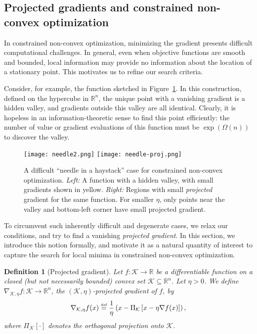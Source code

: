 \documentclass{article}
\newcommand{\equaldef}{\stackrel{\text{\tiny def}}{=}}
\newcommand{\K}{\ensuremath{\mathcal K}}
\newcommand{\pa}[1]{\left(#1\right)}
\newcommand{\bra}[1]{\left[#1\right]}
\newcommand{\R}{\mathbb{R}}
\newtheorem{definition}[theorem]{Definition}
\renewcommand{\K}{\mathcal{K}}
\begin{document}
\subsection{Projected gradients and constrained non-convex optimization}

In constrained non-convex optimization, minimizing the gradient presents difficult computational challenges. In general, even when objective functions are smooth and bounded, local information may provide no information about the location of a stationary point. This motivates us to refine our search criteria.

Consider, for example, the function sketched in Figure~\ref{fig:needle}. In this construction, defined on the hypercube in $\R^n$, the unique point with a vanishing gradient is a hidden valley, and gradients outside this valley are all identical. Clearly, it is hopeless in an information-theoretic sense to find this point efficiently: the number of value or gradient evaluations of this function must be $\exp(\Omega(n))$ to discover the valley.

\begin{center}
\begin{figure}[h!]
\begin{center}
\caption{A difficult ``needle in a haystack'' case for constrained non-convex optimization. \emph{Left:} A function with a hidden valley, with small gradients shown in yellow. \emph{Right:} Regions with small \emph{projected} gradient for the same function. For smaller $\eta$, only points near the valley and bottom-left corner have small projected gradient.} \label{fig:needle}
\vspace{4mm}
\texttt{[image: needle2.png]}
\hspace{12mm}
\texttt{[image: needle-proj.png]}
\end{center}
\end{figure}
\end{center}

To circumvent such inherently difficult and degenerate cases, we relax our conditions, and try to find a vanishing \emph{projected gradient}. In this section, we introduce this notion formally, and motivate it as a natural quantity of interest to capture the search for local minima in constrained non-convex optimization.

\begin{definition}[Projected gradient]
Let $f : \K \rightarrow \R$ be a differentiable function on a closed (but not necessarily bounded) convex set $\K \subseteq \R^n$. Let $\eta > 0$.
We define $\nabla_{\K, \eta} f : \K \rightarrow \R^n$, the \emph{$(\K,\eta)$-projected gradient} of $f$, by
\begin{equation*}
\nabla_{\K, \eta} f(x) \equaldef
\frac{1}{\eta} \pa{ x - \Pi_\K\bra{ x - \eta \nabla f(x) } },
\end{equation*}
where $\Pi_\K[\cdot]$ denotes the orthogonal projection onto $\K$.
\end{definition}
\end{document}
